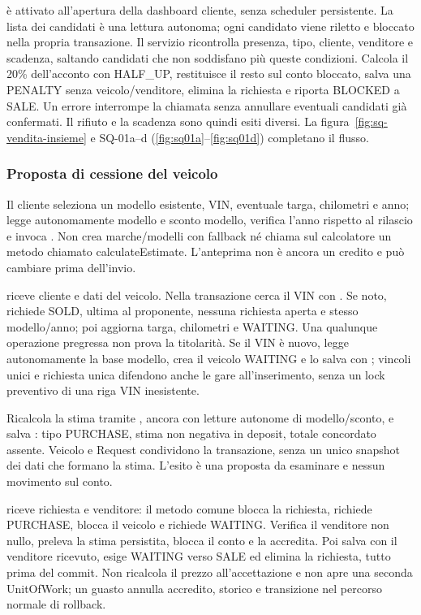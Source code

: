  è attivato all'apertura della dashboard
cliente, senza scheduler persistente. La lista dei candidati è una lettura
autonoma; ogni candidato viene riletto e bloccato nella propria transazione.
Il servizio ricontrolla presenza, tipo, cliente, venditore e scadenza,
saltando candidati che non soddisfano più queste condizioni. Calcola il
20\% dell'acconto con HALF\_UP, restituisce il resto sul conto bloccato,
salva una PENALTY senza veicolo/venditore, elimina la richiesta e riporta
BLOCKED a SALE. Un errore interrompe la chiamata senza annullare eventuali
candidati già confermati. Il rifiuto e la scadenza sono quindi esiti diversi.
La figura~\ref{fig:sq-vendita-insieme} e SQ-01a--d
(\ref{fig:sq01a}--\ref{fig:sq01d}) completano il flusso.

{\raggedright
\subsubsection{Proposta di cessione del veicolo}
Il cliente seleziona un modello esistente, VIN, eventuale targa, chilometri
e anno;  legge autonomamente modello e sconto
modello, verifica l'anno rispetto al rilascio e invoca
. Non crea marche/modelli
con fallback né chiama sul calcolatore un metodo chiamato calculateEstimate.
L'anteprima non è ancora un credito e può cambiare prima dell'invio.\par}


 riceve cliente e dati del veicolo. Nella
transazione cerca il VIN con . Se noto, richiede
SOLD, ultima  al proponente, nessuna richiesta aperta e stesso
modello/anno; poi aggiorna targa, chilometri e WAITING. Una qualunque
operazione pregressa non prova la titolarità. Se il VIN è nuovo, legge
autonomamente la base modello, crea il veicolo WAITING e lo salva con
; vincoli unici e richiesta unica difendono anche le gare
all'inserimento, senza un lock preventivo di una riga VIN inesistente.

Ricalcola la stima tramite , ancora con letture
autonome di modello/sconto, e salva :
tipo PURCHASE, stima non negativa in deposit, totale concordato assente.
Veicolo e Request condividono la transazione, senza un unico snapshot
dei dati che formano la stima. L'esito è una proposta da esaminare e
nessun movimento sul conto.

{\raggedright
{} riceve richiesta e venditore: il metodo comune
 blocca la richiesta, richiede PURCHASE,
blocca il veicolo e richiede WAITING. Verifica il venditore non nullo,
preleva la stima persistita, blocca il conto e la accredita. Poi salva
 con il venditore ricevuto, esige WAITING verso
SALE ed elimina la richiesta, tutto prima del commit. Non ricalcola il
prezzo all'accettazione e non apre una seconda UnitOfWork; un guasto
annulla accredito, storico e transizione nel percorso normale di rollback.\par}


